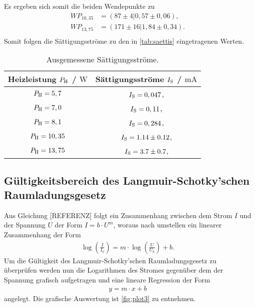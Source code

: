 \noindent
Es ergeben sich somit die beiden Wendepunkte zu
\begin{align*}
  WP_{10,35} &= (87 \pm 4 | 0,57 \pm 0,06), \\
  WP_{13,75} &= (171 \pm 16 | 1,84 \pm 0,34). \\
\end{align*}
Somit folgen die Sättigungsströme zu den in \autoref{tab:saettis} eingetragenen Werten.

\begin{table}[H]
  \caption{Ausgemessene Sättigungsströme.}
  \label{tab:saettis}
  \centering
  \begin{tabular}{c c}
      \toprule
      Heizleistung $P_{\text H}$ / $\si{\watt}$ & Sättigungsströme $I_{\text S}$ / $\si{\milli\ampere}$ \\
      \midrule
      $P_{\text H} = 5,7$ & $I_{\text S} = 0,047$, \\
      $P_{\text H} = 7,0$ & $I_{\text S} = 0,11$, \\
      $P_{\text H} = 8,1$ & $I_{\text S} = 0,284$, \\
      $P_{\text H} = 10,35$ & $I_{\text S} = 1.14 \pm 0.12$, \\
      $P_{\text H} = 13,75$ & $I_{\text S} = 3.7 \pm 0.7$, \\
      \bottomrule
    \end{tabular}
\end{table}

\subsection{Gültigkeitsbereich des Langmuir-Schotky'schen Raumladungsgesetz}
\label{subsec:langmuirSchottky}

Aus Gleichung [REFERENZ] folgt ein Zusammenhang zwischen dem Strom $I$ und der Spannung $U$ der Form $I=b\cdot U^m$, woraus nach umstellen ein linearer Zusammenhang der Form
\begin{align}
  \label{eqn:physLinReg}
  \log\left(\frac{I}{I_0}\right) = m \cdot \log\left(\frac{U}{U_0}\right) +b.
\end{align}
Um die Gültigkeit des Langmuir-Schotky'schen Raumladungsgesetz zu überprüfen werden nun die Logarithmen des Stromes gegenüber dem der Spannung grafisch aufgetragen und
eine lineare Regression der Form
\begin{align}
  \label{eqn:linReg}
  y=m\cdot x+b
\end{align}
angelegt. Die grafische Auswertung ist \autoref{fig:plot3} zu entnehmen.

